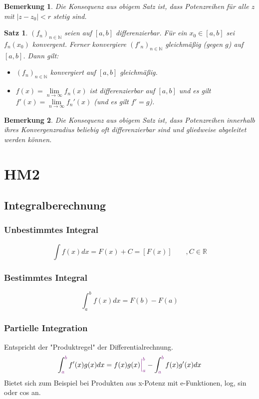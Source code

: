 \documentclass[12pt,a4paper]{report}%
\newtheorem{satz}{Satz}[section]
\newtheorem{bem}{Bemerkung}[section]
\numberwithin{equation}{section}
\newcommand{\R}{\mathbb{R}} %
\newcommand{\N}{\mathbb{N}}
\def\colBord#1{\begingroup\color{Fuchsia}{#1}\endgroup}
\numberwithin{equation}{subsection}
\begin{document}
\begin{bem}
  Die Konsequenz aus obigem Satz ist, dass Potenzreihen für alle $z$ mit $|z-z_0| < r$ stetig sind.
\end{bem}
\begin{satz}
  $(f_n)_{n \in \N}$ seien auf $[a,b]$ differenzierbar. Für ein $x_0 \in [a,b]$ sei $f_n(x_0)$ konvergent. Ferner konvergiere $(f'_n)_{n \in \N}$ gleichmäßig (gegen $g$) auf $[a,b]$. Dann gilt:
  \begin{itemize}
    \item[1) ] $(f_n)_{n \in \N}$ konvergiert auf $[a,b]$ gleichmäßig.
    \item[2) ] $f(x) = \lim\limits_{n \rightarrow \infty} f_n(x)$ ist differenzierbar auf $[a,b]$ und es gilt $f'(x) = \lim\limits_{n \rightarrow \infty} f_n'(x)$ (und es gilt $f' = g$).
  \end{itemize}
\end{satz}
\begin{bem}
  Die Konsequenz aus obigem Satz ist, dass Potenzreihen innerhalb ihres Konvergenzradius beliebig oft differenzierbar sind und gliedweise abgeleitet werden können.
\end{bem}
\newpage
\chapter{HM2}
\section{Integralberechnung}
\subsection{Unbestimmtes Integral}
\begin{equation}
\int f(x) dx = F(x) + C = [F(x)]\qquad, C\in\R \label{eq:def_noBorder}
\end{equation}

\subsection{Bestimmtes Integral}
\begin{equation}
\int_a^b f(x) dx = F(b) - F(a) \label{eq:def_border}
\end{equation}

\subsection{Partielle Integration}
Entspricht der "Produktregel" der Differentialrechnung.
\begin{equation}
\int_{\colBord{a}}^{\colBord{b}} f'(x) g(x) dx = f(x) g(x) \colBord{\Big|_a^b} - \int_{\colBord{a}}^{\colBord{b}} f(x) g'(x) dx \label{eq:rule_partInt}
\end{equation}
Bietet sich zum Beispiel bei Produkten aus x-Potenz mit e-Funktionen, log, sin oder cos an.
\end{document}
